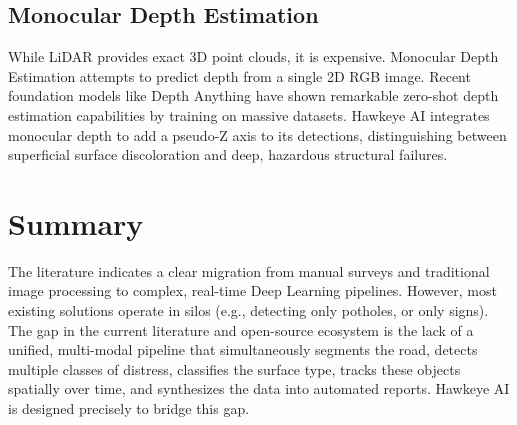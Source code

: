 \subsection{Monocular Depth Estimation}
While LiDAR provides exact 3D point clouds, it is expensive. Monocular Depth Estimation attempts to predict depth from a single 2D RGB image. Recent foundation models like Depth Anything \cite{lihe2024depth} have shown remarkable zero-shot depth estimation capabilities by training on massive datasets. Hawkeye AI integrates monocular depth to add a pseudo-Z axis to its detections, distinguishing between superficial surface discoloration and deep, hazardous structural failures.

\section{Summary}
The literature indicates a clear migration from manual surveys and traditional image processing to complex, real-time Deep Learning pipelines. However, most existing solutions operate in silos (e.g., detecting only potholes, or only signs). The gap in the current literature and open-source ecosystem is the lack of a unified, multi-modal pipeline that simultaneously segments the road, detects multiple classes of distress, classifies the surface type, tracks these objects spatially over time, and synthesizes the data into automated reports. Hawkeye AI is designed precisely to bridge this gap.

\lipsum[6-12] %
